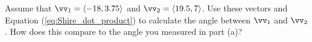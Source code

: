 \begin{pa}
\begin{comment}
\vs

\end{comment}

        \item Assume that ${\vv_1 = \langle -18, 3.75 \rangle}$ and ${\vv_2 = \langle 19.5, 7 \rangle}$. Use these vectors and Equation (\ref{eq:Shire_dot_product}) to calculate the angle between $\vv_1$ and $\vv_2$. How does this compare to the angle you measured in part (a)?

\begin{comment}

Using our formula from the previous problem, with $a = -18$, $b=3.75$, $c=19.5$, and $d = 7$, we have
\[\cos(\alpha) = \frac{(-18)(19.5)+(3.75)(7)}{\sqrt{18^2+3.75^2} \sqrt{19.5^2+7^2}} \approx -.8525021995.\]
So
\[\alpha \approx arccos(-.8525021995) \approx 148.48^{\circ}.\]
This is pretty close to the measurement made in part (a).

\end{comment}

    \ea

\end{pa} \afterpa 